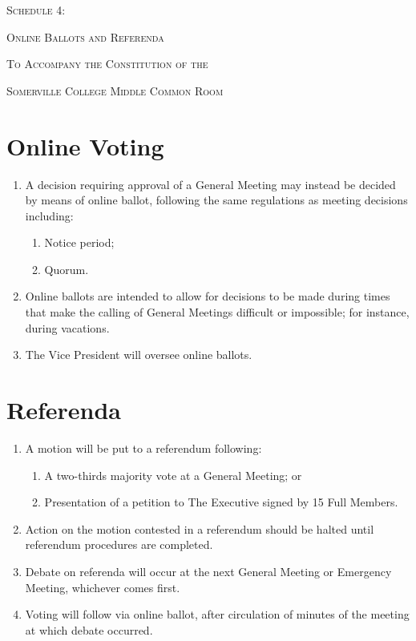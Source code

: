 \documentclass[11pt, a4paper]{article}
\begin{document}
\clearpage
\setcounter{section}{0}





\centerline{{\Huge \textsc{Schedule 4:}}}
\vspace{2mm}
\centerline{{\Huge \textsc{Online Ballots and Referenda}}}
\vspace{2mm}
\centerline{{\Large \textsc{To Accompany the Constitution of the}}}
\vspace{2mm}
\centerline{{\Large \textsc{Somerville College Middle Common Room}}}





\section{Online Voting}
\label{sec:online_voting}

\begin{enumerate}
    \item A decision requiring approval of a General Meeting may instead be decided by means of online ballot, following the same regulations as meeting decisions including:
    \begin{enumerate}
        \item Notice period;
        \item Quorum.
    \end{enumerate}
    \item Online ballots are intended to allow for decisions to be made during times that make the calling of General Meetings difficult or impossible; for instance, during vacations.
    \item The Vice President will oversee online ballots.
\end{enumerate}





\section{Referenda}
\label{sec:referenda}

\begin{enumerate}
    \item A motion will be put to a referendum following:
    \begin{enumerate}
        \item A two-thirds majority vote at a General Meeting; or
        \item Presentation of a petition to The Executive signed by 15 Full Members.
    \end{enumerate}
    \item Action on the motion contested in a referendum should be halted until referendum procedures are completed.
    \item Debate on referenda will occur at the next General Meeting or Emergency Meeting, whichever comes first.
    \item Voting will follow via online ballot, after circulation of minutes of the meeting at which debate occurred.
\end{enumerate}
\end{document}
